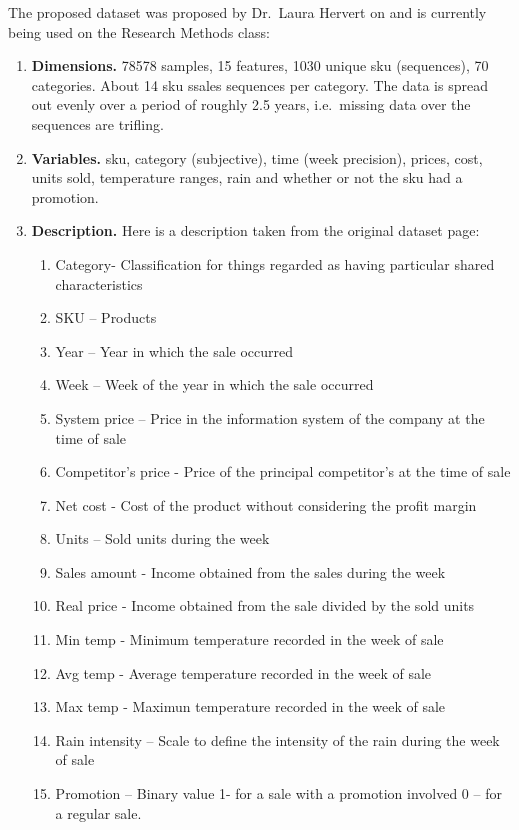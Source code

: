 \documentclass[]{article}
\providecommand{\tightlist}{%
  \setlength{\itemsep}{0pt}\setlength{\parskip}{0pt}}
\theoremstyle{definition}
\theoremstyle{definition}
\theoremstyle{definition}
\theoremstyle{remark}
\begin{document}
The proposed dataset was proposed by Dr.~Laura Hervert on and is
currently being used on the Research Methods class:

\begin{enumerate}
\def\labelenumi{\arabic{enumi}.}
\tightlist
\item
  \textbf{Dimensions.} 78578 samples, 15 features, 1030 unique sku
  (sequences), 70 categories. About 14 sku ssales sequences per
  category. The data is spread out evenly over a period of roughly 2.5
  years, i.e.~missing data over the sequences are trifling.
\item
  \textbf{Variables.} sku, category (subjective), time (week precision),
  prices, cost, units sold, temperature ranges, rain and whether or not
  the sku had a promotion.
\item
  \textbf{Description.} Here is a description taken from the original
  dataset page:

  \begin{enumerate}
  \def\labelenumii{\arabic{enumii}.}
  \tightlist
  \item
    Category- Classification for things regarded as having particular
    shared characteristics
  \item
    SKU -- Products
  \item
    Year -- Year in which the sale occurred
  \item
    Week -- Week of the year in which the sale occurred
  \item
    System price -- Price in the information system of the company at
    the time of sale
  \item
    Competitor's price - Price of the principal competitor's at the time
    of sale
  \item
    Net cost - Cost of the product without considering the profit margin
  \item
    Units -- Sold units during the week
  \item
    Sales amount - Income obtained from the sales during the week
  \item
    Real price - Income obtained from the sale divided by the sold units
  \item
    Min temp - Minimum temperature recorded in the week of sale
  \item
    Avg temp - Average temperature recorded in the week of sale
  \item
    Max temp - Maximun temperature recorded in the week of sale
  \item
    Rain intensity -- Scale to define the intensity of the rain during
    the week of sale
  \item
    Promotion -- Binary value 1- for a sale with a promotion involved 0
    -- for a regular sale.
  \end{enumerate}
\end{enumerate}
\end{document}

